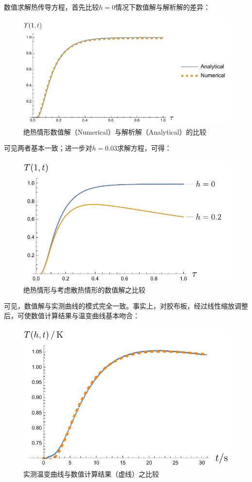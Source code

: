 \documentclass[a4paper,11pt]{article}
\begin{document}
	数值求解热传导方程，首先比较$h=0$情况下数值解与解析解的差异：
	\begin{figure}[H]
	\centering
	\includegraphics[height=.35\linewidth]{numericComp.pdf}
	\caption{绝热情形数值解（Numerical）与解析解（Analytical）的比较}
	\end{figure}\noindent%
	可见两者基本一致；进一步对$h = 0.03$求解方程，可得：
	\begin{figure}[H]
	\centering
	\includegraphics[height=.35\linewidth]{solWithLoss.pdf}
	\caption{绝热情形与考虑散热情形的数值解之比较}
	\label{fig:sealed_vs_lost}
	\end{figure}
	
	可见，数值解与实测曲线的模式完全一致。事实上，对胶布板，经过线性缩放调整后，可使数值计算结果与温变曲线基本吻合：
	\begin{figure}[H]
	\centering
	\includegraphics[height=.35\linewidth]{datFit.pdf}
	\caption{实测温变曲线与数值计算结果（虚线）之比较}
	\end{figure}
	
\end{document}
